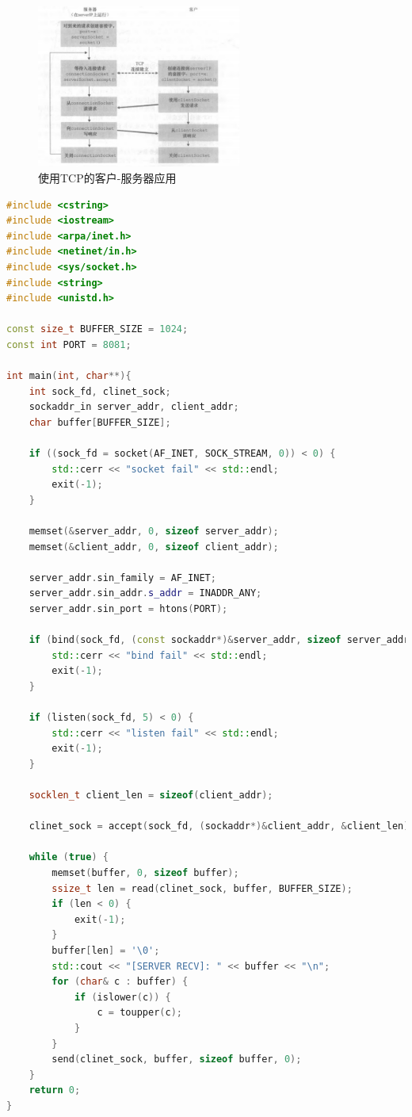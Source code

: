\begin{figure}[!htbp]
    \centering
    \includegraphics[width=0.6\textwidth]{image/chapter02/TCP服务流程.png}
    \caption{使用TCP的客户-服务器应用}
\end{figure}

\begin{lstlisting}[language=C++, caption={tcp server code}]
#include <cstring>
#include <iostream>
#include <arpa/inet.h>
#include <netinet/in.h>
#include <sys/socket.h>
#include <string>
#include <unistd.h>

const size_t BUFFER_SIZE = 1024;
const int PORT = 8081;

int main(int, char**){
    int sock_fd, clinet_sock;
    sockaddr_in server_addr, client_addr;
    char buffer[BUFFER_SIZE];

    if ((sock_fd = socket(AF_INET, SOCK_STREAM, 0)) < 0) {
        std::cerr << "socket fail" << std::endl;
        exit(-1);
    }

    memset(&server_addr, 0, sizeof server_addr);
    memset(&client_addr, 0, sizeof client_addr);

    server_addr.sin_family = AF_INET;
    server_addr.sin_addr.s_addr = INADDR_ANY;
    server_addr.sin_port = htons(PORT);

    if (bind(sock_fd, (const sockaddr*)&server_addr, sizeof server_addr) < 0) {
        std::cerr << "bind fail" << std::endl;
        exit(-1);
    }

    if (listen(sock_fd, 5) < 0) {
        std::cerr << "listen fail" << std::endl;
        exit(-1);
    }

    socklen_t client_len = sizeof(client_addr);

    clinet_sock = accept(sock_fd, (sockaddr*)&client_addr, &client_len);

    while (true) {
        memset(buffer, 0, sizeof buffer);
        ssize_t len = read(clinet_sock, buffer, BUFFER_SIZE);
        if (len < 0) {
            exit(-1);
        }
        buffer[len] = '\0';
        std::cout << "[SERVER RECV]: " << buffer << "\n";
        for (char& c : buffer) {
            if (islower(c)) {
                c = toupper(c);
            }
        }
        send(clinet_sock, buffer, sizeof buffer, 0);
    }
    return 0;
}
\end{lstlisting}

